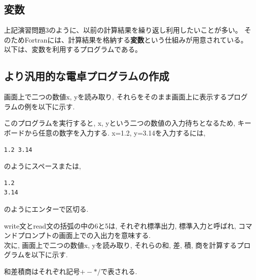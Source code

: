 \documentclass[a4j]{jsbook}
\begin{document}
\subsection*{変数}
上記演習問題3のように、以前の計算結果を繰り返し利用したいことが多い。
そのためFortranには、計算結果を格納する{\bfseries 変数}という仕組みが用意されている。
以下は、変数を利用するプログラムである。



\subsection*{より汎用的な電卓プログラムの作成}

画面上で二つの数値x, yを読み取り, それらをそのまま画面上に表示するプログラムの例を以下に示す. 

このプログラムを実行すると, x, yという二つの数値の入力待ちとなるため, 
キーボードから任意の数字を入力する. 
x=1.2, y=3.14を入力するには, 
\begin{Verbatim}[frame=single]
1.2 3.14
\end{Verbatim}
のようにスペースまたは, 
\begin{Verbatim}[frame=single]
1.2
3.14
\end{Verbatim}
のようにエンターで区切る. 

write文とread文の括弧の中の6と5は, 
それぞれ標準出力, 標準入力と呼ばれ, コマンドプロンプトの画面上での入出力を意味する. \\


次に, 画面上で二つの数値x, yを読み取り, それらの和, 差, 積, 商を計算するプログラムを以下に示す.  

和差積商はそれぞれ記号$+-*/$で表される. 
\\

\end{document}

